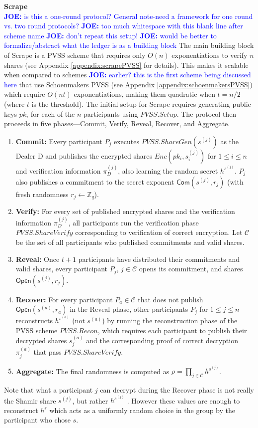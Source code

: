 \documentclass[letterpaper,twocolumn,10pt]{article}
\theoremstyle{definition}
\theoremstyle{remark}
\newcommand{\joenote}[1]{\textcolor{blue}{\textbf{JOE:} #1}}
\begin{document}
\textbf{Scrape}\\
\joenote{is this a one-round protocol? General note-need a framework for one round vs. two round protocols?}
\joenote{too much whitespace with this blank line after scheme name}
 \joenote{don't repeat this setup!} \joenote{would be better to formalize/abstract what the ledger is as a building block} The main building block of Scrape is a PVSS scheme that requires only $O(n)$ exponentiations to verify $n$ shares (see Appendix \ref{appendix:scrapePVSS} for details). This makes it scalable when compared to schemes \joenote{earlier? this is the first scheme being discussed here} that use Schoenmakers PVSS (see Appendix \ref{appendix:schoenmakersPVSS}) which require $O(n t)$ exponentiations, making them quadratic when $t = n/2$ (where $t$ is the threshold). The initial setup for Scrape requires generating public keys $pk_i$ for each of the $n$ participants using $PVSS.Setup$. 
  The protocol then proceeds in five phases---Commit, Verify, Reveal, Recover, and Aggregate.
\begin{enumerate}
\item \textbf{Commit:} Every participant $P_j$ executes $PVSS.ShareGen(s^{(j)})$ as the Dealer D and publishes the encrypted shares $Enc(pk_i, s^{(j)}_i)$ for $1 \le i \le n$ and verification information $\pi_D^{(j)}$, also learning the random secret $h^{s^{(j)}}$. $P_j$ also publishes a commitment to the secret exponent $\mathsf{Com}(s^{(j)}, r_j)$ (with fresh randomness $r_j \leftarrow \mathbb{Z}_q$).
\item \textbf{Verify:} For every set of published encrypted shares and the verification information $\pi_D^{(j)}$, all participants run the verification phase $PVSS.ShareVerify$ corresponding to verification of correct encryption. Let $\mathcal{C}$ be the set of all participants who published commitments and valid shares.
\item \textbf{Reveal:} Once $t+1$ participants have distributed their commitments and valid shares, every participant $P_j$, $j \in \mathcal{C}$ opens its commitment, and shares $\mathsf{Open}(s^{(j)}, r_j)$.
\item \textbf{Recover:} For every participant $P_a \in \mathcal{C}$ that does not publish $\mathsf{Open}(s^{(a)}, r_a)$ in the Reveal phase, other participants $P_j$ for $1 \leq j \leq n$ reconstructs $h^{s^{(a)}}$ (not $s^{(a)}$) by running the reconstruction phase of the PVSS scheme $PVSS.Recon$, which requires each participant to publish their decrypted shares $s_j^{(a)}$ and the corresponding proof of correct decryption $\pi_j^{(a)}$ that pass $PVSS.ShareVerify$.

\item \textbf{Aggregate:} The final randomness is computed as $\rho = \prod_{j \in \mathcal{C}} h^{s^{(j)}}$.
\end{enumerate}
Note that what a participant $j$ can decrypt during the Recover phase is not really the Shamir share $s^{(j)}$, but rather $h^{s^{(j)}}$ . However these values are enough to reconstruct $h^s$ which acts as a uniformly random choice in the group by the participant who chose $s$. \\
\end{document}
